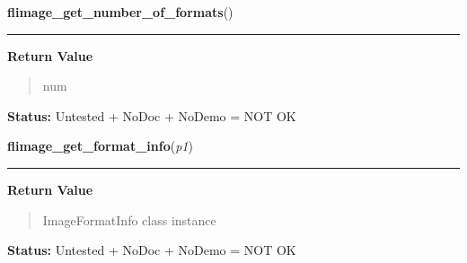     \label{xformslib:library:flimage_get_number_of_formats}

    \vspace{0.5ex}

\hspace{.8\funcindent}\begin{boxedminipage}{\funcwidth}

    \raggedright \textbf{flimage\_get\_number\_of\_formats}()

    \vspace{-1.5ex}

    \rule{\textwidth}{0.5\fboxrule}
\setlength{\parskip}{2ex}
\setlength{\parskip}{1ex}
      \textbf{Return Value}
    \vspace{-1ex}

      \begin{quote}
      num

      \end{quote}

\textbf{Status:} Untested + NoDoc + NoDemo = NOT OK



    \end{boxedminipage}

    \label{xformslib:library:flimage_get_format_info}

    \vspace{0.5ex}

\hspace{.8\funcindent}\begin{boxedminipage}{\funcwidth}

    \raggedright \textbf{flimage\_get\_format\_info}(\textit{p1})

    \vspace{-1.5ex}

    \rule{\textwidth}{0.5\fboxrule}
\setlength{\parskip}{2ex}
\setlength{\parskip}{1ex}
      \textbf{Return Value}
    \vspace{-1ex}

      \begin{quote}
      ImageFormatInfo class instance

      \end{quote}

\textbf{Status:} Untested + NoDoc + NoDemo = NOT OK



    \end{boxedminipage}


